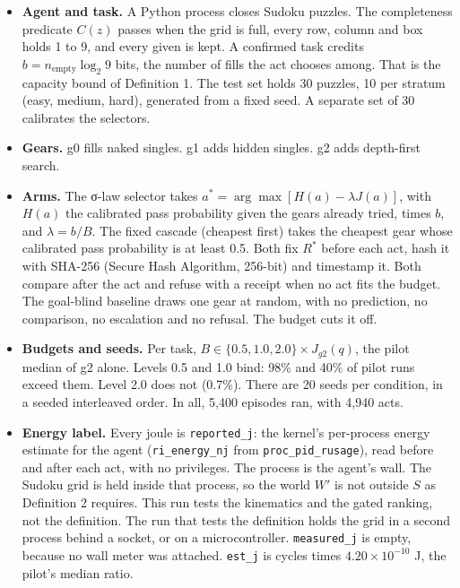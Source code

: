 \documentclass[
  10pt,
]{article}
\providecommand{\tightlist}{%
  \setlength{\itemsep}{0pt}\setlength{\parskip}{0pt}}
\begin{document}
\begin{itemize}
\tightlist
\item
  \textbf{Agent and task.} A Python process closes Sudoku puzzles. The
  completeness predicate \(C(z)\) passes when the grid is full, every
  row, column and box holds 1 to 9, and every given is kept. A confirmed
  task credits \(b = n_{\mathrm{empty}}\log_2 9\) bits, the number of
  fills the act chooses among. That is the capacity bound of Definition
  1. The test set holds 30 puzzles, 10 per stratum (easy, medium, hard),
  generated from a fixed seed. A separate set of 30 calibrates the
  selectors.
\item
  \textbf{Gears.} g0 fills naked singles. g1 adds hidden singles. g2
  adds depth-first search.
\item
  \textbf{Arms.} The σ-law selector takes
  \(a^* = \arg\max[H(a) - \lambda J(a)]\), with \(H(a)\) the calibrated
  pass probability given the gears already tried, times \(b\), and
  \(\lambda = b/B\). The fixed cascade (cheapest first) takes the
  cheapest gear whose calibrated pass probability is at least 0.5. Both
  fix \(R^*\) before each act, hash it with SHA-256 (Secure Hash
  Algorithm, 256-bit) and timestamp it. Both compare after the act and
  refuse with a receipt when no act fits the budget. The goal-blind
  baseline draws one gear at random, with no prediction, no comparison,
  no escalation and no refusal. The budget cuts it off.
\item
  \textbf{Budgets and seeds.} Per task,
  \(B \in \{0.5, 1.0, 2.0\} \times J_{g2}(q)\), the pilot median of g2
  alone. Levels 0.5 and 1.0 bind: 98\% and 40\% of pilot runs exceed
  them. Level 2.0 does not (0.7\%). There are 20 seeds per condition, in
  a seeded interleaved order. In all, 5,400 episodes ran, with 4,940
  acts.
\item
  \textbf{Energy label.} Every joule is \texttt{reported\_j}: the
  kernel's per-process energy estimate for the agent
  (\texttt{ri\_energy\_nj} from \texttt{proc\_pid\_rusage}), read before
  and after each act, with no privileges. The process is the agent's
  wall. The Sudoku grid is held inside that process, so the world \(W'\)
  is not outside \(S\) as Definition 2 requires. This run tests the
  kinematics and the gated ranking, not the definition. The run that
  tests the definition holds the grid in a second process behind a
  socket, or on a microcontroller. \texttt{measured\_j} is empty,
  because no wall meter was attached. \texttt{est\_j} is cycles times
  \(4.20 \times 10^{-10}\) J, the pilot's median ratio.
\end{itemize}
\end{document}
